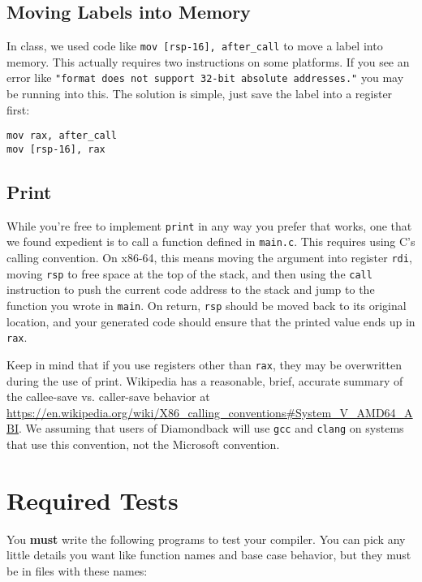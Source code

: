 \documentclass[10pt, oneside]{article}
\begin{document}
\subsection*{Moving Labels into Memory}

In class, we used code like {\tt mov [rsp-16], after\_call} to move a label
into memory. This actually requires two instructions on some platforms. If
you see an error like {\tt "format does not support 32-bit absolute
addresses."} you may be running into this. The solution is simple, just save
the label into a register first:

\begin{lstlisting}
mov rax, after_call
mov [rsp-16], rax
\end{lstlisting}

\subsection*{Print}

While you're free to implement {\tt print} in any way you prefer that works,
one that we found expedient is to call a function defined in {\tt main.c}.
This requires using C's calling convention. On x86-64, this means moving the
argument into register {\tt rdi}, moving {\tt rsp} to free space at the top
of the stack, and then using the {\tt call} instruction to push the current
code address to the stack and jump to the function you wrote in {\tt main}.
On return, {\tt rsp} should be moved back to its original location, and your
generated code should ensure that the printed value ends up in {\tt rax}.

Keep in mind that if you use registers other than {\tt rax}, they may be
overwritten during the use of print. Wikipedia has a reasonable, brief,
accurate summary of the callee-save vs. caller-save behavior at
\url{https://en.wikipedia.org/wiki/X86_calling_conventions\#System_V_AMD64_ABI}.
We assuming that users of Diamondback will use {\tt gcc} and {\tt clang} on
systems that use this convention, not the Microsoft convention.

\section*{Required Tests}

You {\bf must} write the following programs to test your compiler. You can
pick any little details you want like function names and base case behavior,
but they must be in files with these names:
\end{document}
